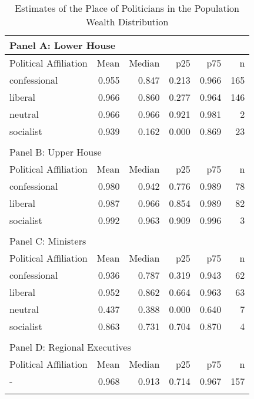 \begin{table}[ht]
\centering
\begin{tabular}{lrrrrr}
   
\multicolumn{6}{l}{Panel A: Lower House}\\ 
\hline
Political Affiliation & Mean & Median & p25 & p75 & n \\\hline

confessional & 0.955 & 0.847 & 0.213 & 0.966 & 165 \\ 
  liberal & 0.966 & 0.860 & 0.277 & 0.964 & 146 \\ 
  neutral & 0.966 & 0.966 & 0.921 & 0.981 & 2 \\ 
  socialist & 0.939 & 0.162 & 0.000 & 0.869 & 23 \\ 
   \hline\\ 
\multicolumn{6}{l}{Panel B: Upper House}\\ 
\hline
Political Affiliation & Mean & Median & p25 & p75 & n \\\hline
confessional & 0.980 & 0.942 & 0.776 & 0.989 & 78 \\ 
  liberal & 0.987 & 0.966 & 0.854 & 0.989 & 82 \\ 
  socialist & 0.992 & 0.963 & 0.909 & 0.996 & 3 \\ 
   \hline\\ 
\multicolumn{6}{l}{Panel C: Ministers}\\ 
\hline
Political Affiliation & Mean & Median & p25 & p75 & n \\\hline
confessional & 0.936 & 0.787 & 0.319 & 0.943 & 62 \\ 
  liberal & 0.952 & 0.862 & 0.664 & 0.963 & 63 \\ 
  neutral & 0.437 & 0.388 & 0.000 & 0.640 & 7 \\ 
  socialist & 0.863 & 0.731 & 0.704 & 0.870 & 4 \\ 
   \hline\\ 
\multicolumn{6}{l}{Panel D: Regional Executives}\\ 
\hline
Political Affiliation & Mean & Median & p25 & p75 & n \\\hline
- & 0.968 & 0.913 & 0.714 & 0.967 & 157 \\ 
   \hline
\multicolumn{6}{l}{}\\
\end{tabular}
\caption{Estimates of the Place of Politicians in the Population Wealth Distribution} 
\label{tab:comp_population}
\end{table}